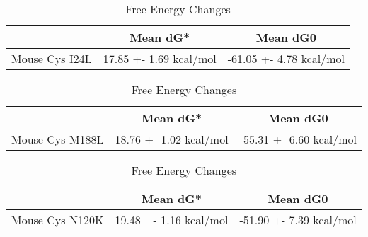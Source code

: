                                   \begin{table}[ht]
                                    \centering
                                    \begin{tabular}{|c|c|c|}
                                    \hline
                                      & Mean dG* & Mean dG0 \\
                                    \hline
                           Mouse Cys I24L & 17.85 +- 1.69 kcal/mol & -61.05 +- 4.78 kcal/mol \\
                                    \hline
                                    \end{tabular}
                                    \caption{Free Energy Changes}
                                    \end{table}
                                  

                                    \begin{table}[ht]
                                      \centering
                                      \begin{tabular}{|c|c|c|}
                                      \hline
                                        & Mean dG* & Mean dG0 \\
                                      \hline
                                 Mouse Cys M188L & 18.76 +- 1.02 kcal/mol & -55.31 +- 6.60 kcal/mol \\
                                      \hline
                                      \end{tabular}
                                      \caption{Free Energy Changes}
                                      \end{table}
                                      

                                      \begin{table}[ht]
                                        \centering
                                        \begin{tabular}{|c|c|c|}
                                        \hline
                                          & Mean dG* & Mean dG0 \\
                                        \hline
                                  Mouse Cys N120K & 19.48 +- 1.16 kcal/mol & -51.90 +- 7.39 kcal/mol \\
                                        \hline
                                        \end{tabular}
                                        \caption{Free Energy Changes}
                                        \end{table}




